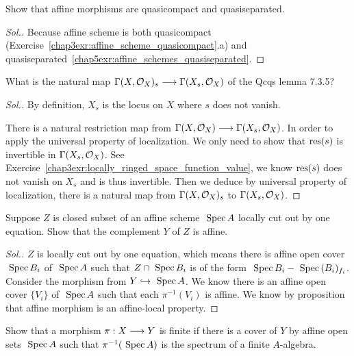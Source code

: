 \documentclass[11pt]{book} %
\begin{document}
\begin{exr}
Show that affine morphisms are quasicompact and quasiseparated.
\end{exr}
\begin{proof}[Sol.]
Because affine scheme is both quasicompact (Exercise~\ref{chap3exr:affine_scheme_quasicompact}.a) and quasiseparated~\ref{chap5exr:affine_schemes_quasiseparated}.
\end{proof}
\begin{exr}
What is  the natural map $\Gamma(X,{\cal O}_X)_s\longrightarrow \Gamma(X_s,{\cal O}_X)$ of the Qcqs lemma 7.3.5?
\end{exr}
\begin{proof}[Sol.]
By definition, $X_s$ is the locus on $X$ where $s$ does not vanish.

There is a natural restriction map from $\Gamma(X,{\cal O}_X)\longrightarrow \Gamma(X_s,{\cal O}_X)$. In order to apply the universal property of localization. We only need to show that $\text{res}(s)$ is invertible in $\Gamma(X_s,{\cal O}_X)$. See Exercise~\ref{chap3exr:locally_ringed_space_function_value}, we know $\text{res}(s)$ does not vanish on $X_s$ and is thus invertible. Then we deduce by universal property of localization, there is a natural map from $\Gamma(X,{\cal O}_X)_s$ to $\Gamma(X_s,{\cal O}_X)$. 
\end{proof}
\begin{exr}
Suppose $Z$ is closed subset of an affine scheme $\text{ Spec\,} A$ locally cut out by one equation. Show that the complement $Y$ of $Z$ is affine.
\end{exr}
\begin{proof}[Sol.]
$Z$ is locally cut out by one equation, which means there is affine open cover $\text{ Spec\,} B_i$ of $\text{ Spec\,} A$ such that $Z\cap \text{ Spec\,} B_i$ is of the form $\text{ Spec\,} B_i-\text{ Spec\,} (B_i)_{f_i}$. Consider the morphism from $Y\hookrightarrow \text{ Spec\,} A$. We know there is an affine open cover $\{V_i\}$ of $\text{ Spec\,} A$ such that each $\pi^{-1}(V_i)$ is affine. We know by proposition that affine morphism is  an affine-local property.
\end{proof}
\begin{exr}\label{chap7exr:finiteness_is_affin-local_on_target}
Show that a morphism $\pi:X\longrightarrow Y$ is finite if there is a cover of $Y$ by affine open sets $\text{ Spec\,} A$ such that $\pi^{-1}(\text{ Spec\,} A)$ is the spectrum of a finite $A$-algebra.
\end{exr}
\end{document}
